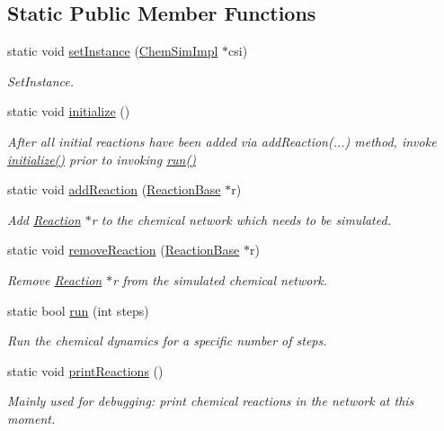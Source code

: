 \subsection*{Static Public Member Functions}
\begin{DoxyCompactItemize}
\item 
static void \hyperlink{classChemSim_a0f8a949bc07480c36b590128180e56e7}{set\+Instance} (\hyperlink{classChemSimImpl}{Chem\+Sim\+Impl} $\ast$csi)
\begin{DoxyCompactList}\small\item\em Set\+Instance. \end{DoxyCompactList}\item 
static void \hyperlink{classChemSim_affbdef9382a7c693a08f03f19e60d7fb}{initialize} ()
\begin{DoxyCompactList}\small\item\em After all initial reactions have been added via add\+Reaction(...) method, invoke \hyperlink{classChemSim_affbdef9382a7c693a08f03f19e60d7fb}{initialize()} prior to invoking \hyperlink{classChemSim_a60bf7095bcc35a4865a2bb191b070fc9}{run()} \end{DoxyCompactList}\item 
static void \hyperlink{classChemSim_a7ef2b5545a5250201b96c666b5ba6f92}{add\+Reaction} (\hyperlink{classReactionBase}{Reaction\+Base} $\ast$r)
\begin{DoxyCompactList}\small\item\em Add \hyperlink{classReaction}{Reaction} $\ast$r to the chemical network which needs to be simulated. \end{DoxyCompactList}\item 
static void \hyperlink{classChemSim_aefddf4bedce37ad6d9afef1631df96a1}{remove\+Reaction} (\hyperlink{classReactionBase}{Reaction\+Base} $\ast$r)
\begin{DoxyCompactList}\small\item\em Remove \hyperlink{classReaction}{Reaction} $\ast$r from the simulated chemical network. \end{DoxyCompactList}\item 
static bool \hyperlink{classChemSim_a60bf7095bcc35a4865a2bb191b070fc9}{run} (int steps)
\begin{DoxyCompactList}\small\item\em Run the chemical dynamics for a specific number of steps. \end{DoxyCompactList}\item 
static void \hyperlink{classChemSim_acc1d8030a587b1996d18c0ea775c34f0}{print\+Reactions} ()
\begin{DoxyCompactList}\small\item\em Mainly used for debugging\+: print chemical reactions in the network at this moment. \end{DoxyCompactList}\end{DoxyCompactItemize}
